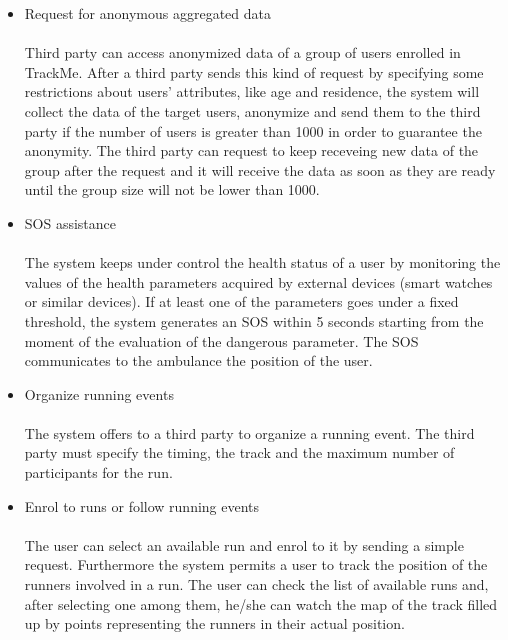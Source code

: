 \documentclass{article}
\begin{document}
\begin{legal}
\begin{legal}
{\begin{itemize}
		This function permits a third party (an association, an hospital, a company, etc) to ask for the data of a single user. More in detail, the third party can select a user by his/her fiscal code and send him/her a request to be allowed to access his/her data. If the user accepts it, then the third party will receive his/her data. The third party can request to keep monitoring the individual also after the request and it will receive the data as soon as they are ready. The user can decide to deny the permission at any moment. \\
		\item Request for anonymous aggregated data\\\\
		Third party can access anonymized data of a group of users enrolled in TrackMe. After a third party sends this kind of request by specifying some restrictions about users’ attributes, like age and residence, the system will collect the data of the target users, anonymize and send them to the third party if the number of users is greater than 1000 in order to guarantee the anonymity. The third party can request to keep receveing new data of the group after the request and it will receive the data as soon as they are ready until the group size will not be lower than 1000.\\
		\item SOS assistance\\\\
		The system keeps under control the health status of a user by monitoring the values of the health parameters acquired by external devices (smart watches or similar devices). If at least one of the parameters goes under a fixed threshold, the system generates an SOS within 5 seconds starting from the moment of the evaluation of the dangerous parameter. The SOS communicates to the ambulance the position of the user.\\
		\item Organize running events\\\\
		The system offers to a third party to organize a running event. The third party must specify the timing, the track and the maximum number of participants for the run.\\
		\item Enrol to runs or follow running events\\\\
		The user can select an available run and enrol to it by sending a simple request. Furthermore the system permits a user to track the position of the runners involved in a run. The user can check the list of available runs and, after selecting one among them, he/she can watch the map of the track filled up by points representing the runners in their actual position. \\

\end{itemize}}
\end{legal}
\end{legal}
\end{document}
